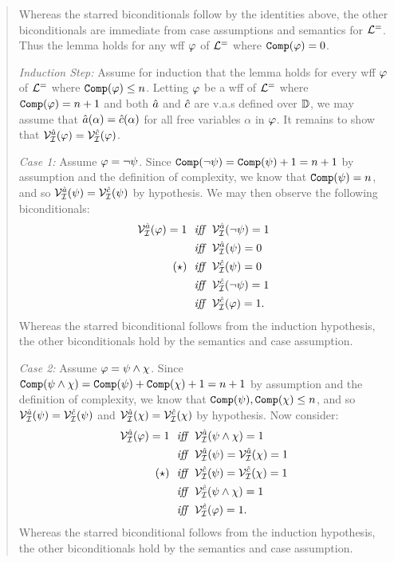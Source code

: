 \begin{quote}
\begin{multicols}{2}
  \end{multicols}

  Whereas the starred biconditionals follow by the identities above, the other biconditionals are immediate from case assumptions and semantics for $\mathcal{L}^{=}$.
  Thus the lemma holds for any wff $\varphi$ of $\mathcal{L}^{=}$ where $\texttt{Comp}(\varphi) = 0$.

  \textit{Induction Step:}
  Assume for induction that the lemma holds for every wff $\varphi$ of $\mathcal{L}^{=}$ where $\texttt{Comp}(\varphi) \leq n$.
  Letting $\varphi$ be a wff of $\mathcal{L}^{=}$ where $\texttt{Comp}(\varphi) = n + 1$ and both $\hat{a}$ and $\hat{c}$ are v.a.s defined over $\mathbb{D}$, we may assume that $\hat{a}(\alpha)=\hat{c}(\alpha)$ for all free variables $\alpha$ in $\varphi$. 
  It remains to show that $\mathcal{V}_{\mathcal{I}}^{\hat{a}}(\varphi)=\mathcal{V}_{\mathcal{I}}^{\hat{c}}(\varphi)$.

  \textit{Case 1:}
  Assume $\varphi = \neg \psi$.
  Since $\texttt{Comp}(\neg \psi) = \texttt{Comp}(\psi) + 1 = n + 1$ by assumption and the definition of complexity, we know that $\texttt{Comp}(\psi) = n$, and so $\mathcal{V}_{\mathcal{I}}^{\hat{a}}(\psi)=\mathcal{V}_{\mathcal{I}}^{\hat{c}}(\psi)$ by hypothesis.
  We may then observe the following biconditionals:
  \begin{align*}
    \mathcal{V}_{\mathcal{I}}^{\hat{a}}(\varphi) = 1
      ~~\textit{iff}~~  & \mathcal{V}_{\mathcal{I}}^{\hat{a}}(\neg \psi) = 1\\
      ~~\textit{iff}~~  & \mathcal{V}_{\mathcal{I}}^{\hat{a}}(\psi) = 0\\
      (\star) ~~\textit{iff}~~  & \mathcal{V}_{\mathcal{I}}^{\hat{c}}(\psi) = 0\\
      ~~\textit{iff}~~  & \mathcal{V}_{\mathcal{I}}^{\hat{c}}(\neg \psi) = 1\\
      ~~\textit{iff}~~  & \mathcal{V}_{\mathcal{I}}^{\hat{c}}(\varphi) = 1.
  \end{align*}
  Whereas the starred biconditional follows from the induction hypothesis, the other biconditionals hold by the semantics and case assumption.

  \textit{Case 2:}
  Assume $\varphi = \psi \wedge \chi$.
  Since $\texttt{Comp}(\psi \wedge \chi) = \texttt{Comp}(\psi) + \texttt{Comp}(\chi) + 1 = n + 1$ by assumption and the definition of complexity, we know that $\texttt{Comp}(\psi), \texttt{Comp}(\chi) \leq n$, and so $\mathcal{V}_{\mathcal{I}}^{\hat{a}}(\psi)=\mathcal{V}_{\mathcal{I}}^{\hat{c}}(\psi)$ and $\mathcal{V}_{\mathcal{I}}^{\hat{a}}(\chi)=\mathcal{V}_{\mathcal{I}}^{\hat{c}}(\chi)$ by hypothesis.
  Now consider:
  \begin{align*}
    \mathcal{V}_{\mathcal{I}}^{\hat{a}}(\varphi) = 1
      ~~\textit{iff}~~  & \mathcal{V}_{\mathcal{I}}^{\hat{a}}(\psi \wedge \chi) = 1\\
      ~~\textit{iff}~~  & \mathcal{V}_{\mathcal{I}}^{\hat{a}}(\psi) = \mathcal{V}_{\mathcal{I}}^{\hat{a}}(\chi) = 1\\
      (\star) ~~\textit{iff}~~  & \mathcal{V}_{\mathcal{I}}^{\hat{c}}(\psi) = \mathcal{V}_{\mathcal{I}}^{\hat{c}}(\chi) = 1\\
      ~~\textit{iff}~~  & \mathcal{V}_{\mathcal{I}}^{\hat{c}}(\psi \wedge \chi) = 1\\
      ~~\textit{iff}~~  & \mathcal{V}_{\mathcal{I}}^{\hat{c}}(\varphi) = 1.
  \end{align*}
  Whereas the starred biconditional follows from the induction hypothesis, the other biconditionals hold by the semantics and case assumption.


\end{quote}
